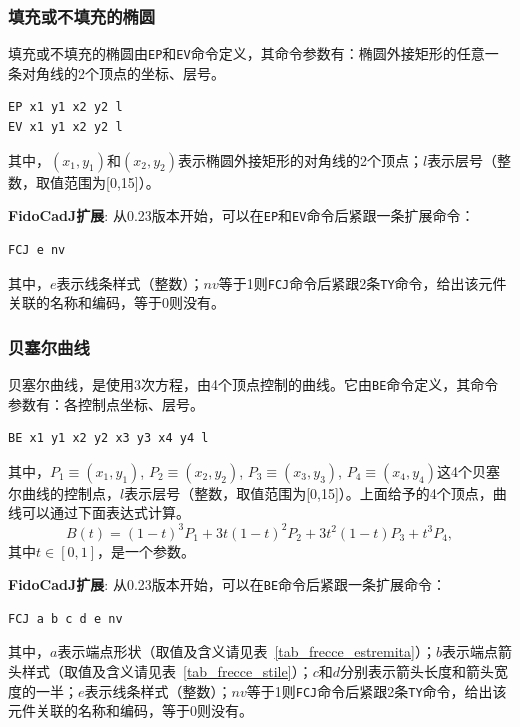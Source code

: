 \documentclass[10pt,a4paper,twoside]{scrreprt}
\begin{document}
\subsubsection{填充或不填充的椭圆}

填充或不填充的椭圆由\lstinline!EP!和\lstinline!EV!命令定义，其命令参数有：椭圆外接矩形的任意一条对角线的2个顶点的坐标、层号。
\begin{lstlisting} 
EP x1 y1 x2 y2 l 
EV x1 y1 x2 y2 l 
\end{lstlisting} 
其中，$(x_{1},y_{1})$和$(x_{2},y_{2})$表示椭圆外接矩形的对角线的2个顶点；$l$表示层号（整数，取值范围为[0,15]）。

\textbf{FidoCadJ扩展}: 从0.23版本开始，可以在\lstinline!EP!和\lstinline!EV!命令后紧跟一条扩展命令：
\begin{lstlisting} 
FCJ e nv
\end{lstlisting}
其中，$e$表示线条样式（整数）；$nv$等于1则\lstinline!FCJ!命令后紧跟2条\lstinline!TY!命令，给出该元件关联的名称和编码，等于0则没有。

\subsubsection{贝塞尔曲线}

贝塞尔曲线，是使用3次方程，由4个顶点控制的曲线。它由\lstinline!BE!命令定义，其命令参数有：各控制点坐标、层号。
\begin{lstlisting} 
BE x1 y1 x2 y2 x3 y3 x4 y4 l 
\end{lstlisting} 
其中，$P_{1}\equiv(x_{1},y_{1})$, $P_{2}\equiv(x_{2},y_{2})$, $P_{3}\equiv(x_{3},y_{3})$, $P_{4}\equiv(x_{4},y_{4})$这4个贝塞尔曲线的控制点，$l$表示层号（整数，取值范围为[0,15]）。上面给予的4个顶点，曲线可以通过下面表达式计算。\begin{equation}
B(t)=(1-t)^{3}P_{1}+3t(1-t)^{2}P_{2}+3t^{2}(1-t)P_{3}+t^{3}P_{4},\end{equation}
其中$t\in[0,1]$，是一个参数。

\textbf{FidoCadJ扩展}: 从0.23版本开始，可以在\lstinline!BE!命令后紧跟一条扩展命令：
\begin{lstlisting} 
FCJ a b c d e nv
\end{lstlisting}
其中，$a$表示端点形状（取值及含义请见表~\ref{tab_frecce_estremita}）；$b$表示端点箭头样式（取值及含义请见表~\ref{tab_frecce_stile}）；$c$和$d$分别表示箭头长度和箭头宽度的一半；$e$表示线条样式（整数）；$nv$等于1则\lstinline!FCJ!命令后紧跟2条\lstinline!TY!命令，给出该元件关联的名称和编码，等于0则没有。
\end{document}
